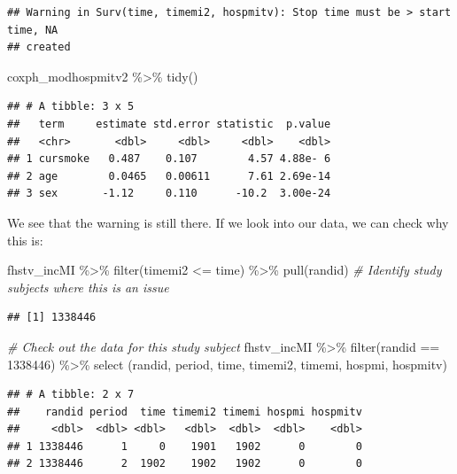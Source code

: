\documentclass[
]{book}
\newenvironment{Shaded}{\begin{snugshade}}{\end{snugshade}}
\newcommand{\CommentTok}[1]{\textcolor[rgb]{0.56,0.35,0.01}{\textit{#1}}}
\newcommand{\FunctionTok}[1]{\textcolor[rgb]{0.00,0.00,0.00}{#1}}
\newcommand{\NormalTok}[1]{#1}
\newcommand{\SpecialCharTok}[1]{\textcolor[rgb]{0.00,0.00,0.00}{#1}}
\newcommand{\StringTok}[1]{\textcolor[rgb]{0.31,0.60,0.02}{#1}}
\begin{document}
\begin{verbatim}
## Warning in Surv(time, timemi2, hospmitv): Stop time must be > start time, NA
## created
\end{verbatim}

\begin{Shaded}
\begin{Highlighting}[]
\NormalTok{coxph\_modhospmitv2 }\SpecialCharTok{\%\textgreater{}\%}
  \FunctionTok{tidy}\NormalTok{()}
\end{Highlighting}
\end{Shaded}

\begin{verbatim}
## # A tibble: 3 x 5
##   term     estimate std.error statistic  p.value
##   <chr>       <dbl>     <dbl>     <dbl>    <dbl>
## 1 cursmoke   0.487    0.107        4.57 4.88e- 6
## 2 age        0.0465   0.00611      7.61 2.69e-14
## 3 sex       -1.12     0.110      -10.2  3.00e-24
\end{verbatim}

We see that the warning is still there. If we look into our data, we can check why this is:

\begin{Shaded}
\begin{Highlighting}[]
\NormalTok{fhstv\_incMI }\SpecialCharTok{\%\textgreater{}\%}
  \FunctionTok{filter}\NormalTok{(timemi2 }\SpecialCharTok{\textless{}=}\NormalTok{ time) }\SpecialCharTok{\%\textgreater{}\%}
  \FunctionTok{pull}\NormalTok{(randid) }\CommentTok{\# Identify study subjects where this is an issue}
\end{Highlighting}
\end{Shaded}

\begin{verbatim}
## [1] 1338446
\end{verbatim}

\begin{Shaded}
\begin{Highlighting}[]
\CommentTok{\# Check out the data for this study subject}
\NormalTok{fhstv\_incMI }\SpecialCharTok{\%\textgreater{}\%} 
  \FunctionTok{filter}\NormalTok{(randid }\SpecialCharTok{==} \StringTok{\textquotesingle{}1338446\textquotesingle{}}\NormalTok{) }\SpecialCharTok{\%\textgreater{}\%}
  \FunctionTok{select}\NormalTok{ (randid, period, time, timemi2, timemi, hospmi, hospmitv)}
\end{Highlighting}
\end{Shaded}

\begin{verbatim}
## # A tibble: 2 x 7
##    randid period  time timemi2 timemi hospmi hospmitv
##     <dbl>  <dbl> <dbl>   <dbl>  <dbl>  <dbl>    <dbl>
## 1 1338446      1     0    1901   1902      0        0
## 2 1338446      2  1902    1902   1902      0        0
\end{verbatim}
\end{document}
